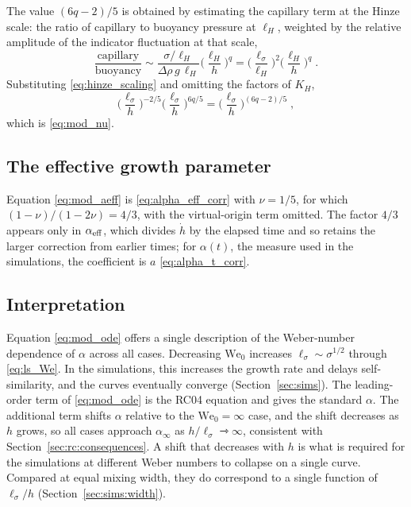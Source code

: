 \documentclass[11pt]{article}
\numberwithin{equation}{section}
\newcommand{\We}{\mathrm{We}_0}
\newcommand{\ls}{\ell_\sigma}
\newcommand{\hd}{\dot h}
\begin{document}
The value $(6 q - 2)/5$ is obtained by estimating the capillary term at the Hinze scale: the ratio of capillary to buoyancy pressure at $\ell_H$, weighted by the relative amplitude of the indicator fluctuation at that scale,
\begin{equation}\label{eq:hinze_estimate}
\frac{\text{capillary}}{\text{buoyancy}} \sim \frac{\sigma/\ell_H}{\Delta \rho \, g \, \ell_H}
\Big(\frac{\ell_H}{h}\Big)^{q} = \Big(\frac{\ls}{\ell_H}\Big)^2 \Big(\frac{\ell_H}{h}\Big)^{q} \;.
\end{equation}
Substituting \eqref{eq:hinze_scaling} and omitting the factors of $K_H$,
\begin{equation}\label{eq:hinze_nu}
\Big(\frac{\ls}{h}\Big)^{-2/5} \Big(\frac{\ls}{h}\Big)^{6 q/5} = \Big(\frac{\ls}{h}\Big)^{(6 q - 2)/5} \;,
\end{equation}
which is \eqref{eq:mod_nu}.

\subsection{The effective growth parameter}\label{sec:modified:aeff}
Equation \eqref{eq:mod_aeff} is \eqref{eq:alpha_eff_corr} with $\nu = 1/5$, for which $(1 - \nu)/(1 - 2 \nu) = 4/3$, with the virtual-origin term omitted. The factor $4/3$ appears only in $\alpha_{\rm eff}$, which divides $\hd$ by the elapsed time and so retains the larger correction from earlier times; for $\alpha(t)$, the measure used in the simulations, the coefficient is $a$ \eqref{eq:alpha_t_corr}.

\subsection{Interpretation}\label{sec:modified:interp}
Equation \eqref{eq:mod_ode} offers a single description of the Weber-number dependence of $\alpha$ across all cases. Decreasing $\We$ increases $\ls \sim \sigma^{1/2}$ through \eqref{eq:ls_We}. In the simulations, this increases the growth rate and delays self-similarity, and the curves eventually converge (Section~\ref{sec:sims}). The leading-order term of \eqref{eq:mod_ode} is the RC04 equation and gives the standard $\alpha$. The additional term shifts $\alpha$ relative to the $\We = \infty$ case, and the shift decreases as $h$ grows, so all cases approach $\alpha_\infty$ as $h/\ls \rightarrowtriangle \infty$, consistent with Section~\ref{sec:rc:consequences}. A shift that decreases with $h$ is what is required for the simulations at different Weber numbers to collapse on a single curve. Compared at equal mixing width, they do correspond to a single function of $\ls/h$ (Section~\ref{sec:sims:width}).
\end{document}
